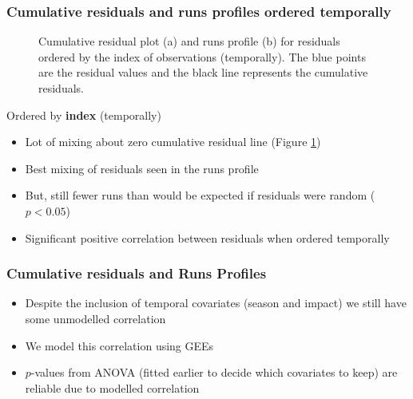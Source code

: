 \documentclass[11pt, a4paper]{article}
\begin{document}
\begin{frame}[fragile]
\frametitle{Cumulative residuals and runs profiles ordered temporally}  
\begin{figure}[h]
  \centering
  \caption{Cumulative residual plot (a) and runs profile (b) for residuals ordered by the index of observations (temporally).  The blue points are the residual values and the black line represents the cumulative residuals.}
  \label{fig:geeruns3}
\end{figure}
\end{frame}


\begin{frame}[fragile]
Ordered by \textbf{index} (temporally)
\begin{itemize}
\item Lot of mixing about zero cumulative residual line (Figure \ref{fig:geeruns3})
\item Best mixing of residuals seen in the runs profile 
\item But, still fewer runs than would be expected if residuals were random ($p<0.05$)
\item Significant positive correlation between residuals when ordered temporally
\end{itemize}
\end{frame}

\begin{frame}
\frametitle{Cumulative residuals and Runs Profiles}
\begin{itemize}
  \item Despite the inclusion of temporal covariates (season and impact) we still have some unmodelled correlation
  \item We model this correlation using GEEs
  \item $p$-values from ANOVA (fitted earlier to decide which covariates to keep) are reliable due to modelled correlation
\end{itemize}


\end{frame}
\end{document}

